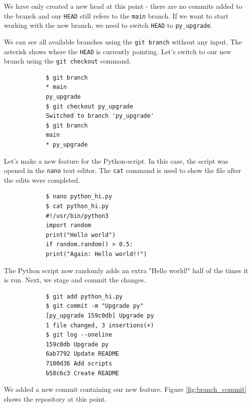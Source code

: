 \documentclass[../main/git_course_main.tex]{subfiles}
\begin{document}
	We have only created a new head at this point - there are no commits added to the branch and our \verb$HEAD$ still refers to the \verb$main$ branch. If we want to start working with the new branch, we need to switch \verb$HEAD$ to \verb$py_upgrade$.
	
	We can see all available branches using the \verb$git branch$ without any
	input. The asterisk shows where the \verb$HEAD$ is currently pointing.
	Let's switch to our new branch using the \verb$git checkout$ command.
	
	\begin{codebox}
		\begin{lstlisting}
			$ git branch
			* main
			py_upgrade
			$ git checkout py_upgrade
			Switched to branch 'py_upgrade'
			$ git branch 
			main
			* py_upgrade
		\end{lstlisting}
	\end{codebox}
	
	Let's make a new feature for the Python-script. In this case, the script was opened in the \verb$nano$ text editor. The \verb$cat$ command is used to show the file after the edits were completed.
	
	\begin{codebox}
		\begin{lstlisting}
			$ nano python_hi.py
			$ cat python_hi.py
			#!/usr/bin/python3
			import random
			print("Hello world")
			if random.random() > 0.5:
			print("Again: Hello world!!")
		\end{lstlisting}
	\end{codebox}
	
	The Python script now randomly adds an extra "Hello world!" half of the times it is run. Next, we stage and commit the changes.
	
	\begin{codebox}
		\begin{lstlisting}
			$ git add python_hi.py
			$ git commit -m "Upgrade py"
			[py_upgrade 159c0db] Upgrade py
			1 file changed, 3 insertions(+)
			$ git log --oneline
			159c0db Upgrade py
			6ab7792 Update README
			7100d36 Add scripts
			b58c6c3 Create README
		\end{lstlisting}
	\end{codebox}
	
	We added a new commit containing our new feature. Figure \ref{fig:branch_commit} shows the repository at this point.
	
\end{document}
